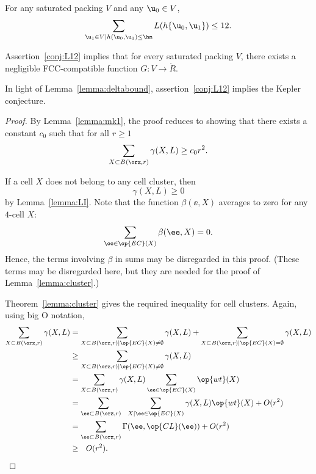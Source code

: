 \begin{lemma*}\label{conj:L12} 
  For any  saturated packing $ V$ and any $ \u_0\in V$,
\begin{equation}\label{eqn:L12} 
\sum_{ \u_1\in V\mid h( \u_0, \u_1)\le \hm} L(h\{\u_0, \u_1\}) \le 12.
\end{equation}
\end{lemma*}

\begin{lemma}[]\label{theorem:mk2} 
Assertion~\ref{conj:L12} implies
that for every saturated packing $V$, there exists a negligible FCC-compatible function
$G:V\to \ring{R}$.
\end{lemma}

\begin{remark}\label{rem:L12KC}
In light of Lemma~\ref{lemma:deltabound}, assertion~\ref{conj:L12}
implies the Kepler conjecture. 
\end{remark}

\begin{proof} 
  By Lemma~\ref{lemma:mk1}, the proof reduces to showing that there
  exists a constant $c_0$ such that for all $r\ge1$
\[
\sum_{X\subset B(\orz,r)} \gamma(X,L) \ge c_0 r^2.
\]

If a cell $X$ does not belong to any cell cluster, then
\[ 
\gamma(X,L)\ge 0
\] 
by Lemma~\ref{lemma:LI}.  Note that the function
$\beta(\ee,X)$ averages to zero for any $4$-cell $X$:
\[  
\sum_{\ee\in \op{EC}(X)} \beta(\ee,X) = 0.
\] 
Hence, the terms involving $\beta$ in sums may be disregarded in this
proof.  (These terms may be disregarded here, but they are needed for
the proof of Lemma~\ref{lemma:cluster}.)

Theorem~\ref{lemma:cluster} gives the required inequality for cell
clusters.  Again, using big O notation,
\begin{align*} 
\sum_{X\subset B(\orz,r)} \gamma(X,L) &=
\sum_{X\subset B(\orz,r)\mid \op{EC}(X)\ne\emptyset} \gamma(X,L) +
\sum_{X\subset B(\orz,r)\mid \op{EC}(X)=\emptyset} \gamma(X,L) \vspace{6pt}\\
&\ge \sum_{X\subset B(\orz,r)\mid \op{EC}(X)\ne\emptyset} \gamma(X,L)\vspace{6pt} \\
&=\sum_{X\subset B(\orz,r)}\gamma(X,L)\sum_{\ee \in \op{EC}(X)}\op{wt}(X) \vspace{6pt}\\
&=\sum_{\ee\subset B(\orz,r)~~}\sum_{X\mid \ee \in \op{EC}(X)}\gamma(X,L)\op{wt}(X) + O(r^2)\vspace{6pt}\\
&=\sum_{\ee\subset B(\orz,r)}\Gamma(\ee,\op{CL}(\ee)) + O(r^2)\vspace{6pt}\\
&\ge ~~O(r^2).
\end{align*}
\end{proof}

